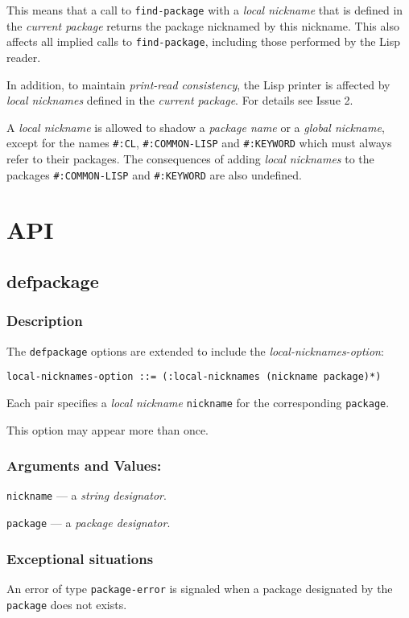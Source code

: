 \documentclass[11pt]{article}
\begin{document}
This means that a call to \texttt{find-package} with a \emph{local nickname} that is defined in
the \emph{current package} returns the package nicknamed by this nickname. This also
affects all implied calls to \texttt{find-package}, including those performed by the Lisp
reader.

In addition, to maintain \emph{print-read consistency}, the Lisp printer is affected by
\emph{local nicknames} defined in the \emph{current package}.  For details see Issue 2.

A \emph{local nickname} is allowed to shadow a \emph{package name} or a \emph{global nickname},
except for the names \texttt{\#:CL}, \texttt{\#:COMMON-LISP} and \texttt{\#:KEYWORD} which must always
refer to their packages. The consequences of adding \emph{local nicknames} to the
packages \texttt{\#:COMMON-LISP} and \texttt{\#:KEYWORD} are also undefined.
\section{API}
\label{sec:org84a03a1}
\subsection{defpackage}
\label{sec:org1f38869}
\subsubsection{Description}
\label{sec:orgf7ce34b}
The \texttt{defpackage} options are extended to include the \emph{local-nicknames-option}:
\begin{verbatim}
local-nicknames-option ::= (:local-nicknames (nickname package)*)
\end{verbatim}


Each pair specifies a \emph{local nickname} \texttt{nickname} for the corresponding \texttt{package}.

This option may appear more than once.
\subsubsection{Arguments and Values:}
\label{sec:orgd65d238}
\texttt{nickname} --- a \emph{string designator}.

\texttt{package} --- a \emph{package designator}.
\subsubsection{Exceptional situations}
\label{sec:org63798b8}
An error of type \texttt{package-error} is signaled when a package designated by the
\texttt{package} does not exists.
\end{document}
